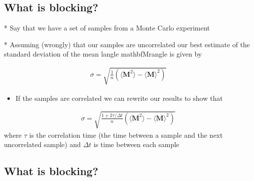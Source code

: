 \documentclass[letterpaper,10pt,english]{sphinxmanual}
\begin{document}
\subsection{What is blocking?}
\label{\detokenize{chapter3:what-is-blocking}}

\begin{sphinxVerbatim}[commandchars=\\\{\}]
* Say that we have a set of samples from a Monte Carlo experiment

* Assuming (wrongly) that our samples are uncorrelated our best estimate of the standard deviation of the mean \PYGZdl{}\PYGZbs{}langle \PYGZbs{}mathbf\PYGZob{}M\PYGZcb{}\PYGZbs{}rangle\PYGZdl{} is given by
\end{sphinxVerbatim}
\begin{equation*}
\begin{split}
\sigma=\sqrt{\frac{1}{n}\left(\langle \mathbf{M}^2\rangle-\langle \mathbf{M}\rangle^2\right)}
\end{split}
\end{equation*}\begin{itemize}
\item {} 
If the samples are correlated we can rewrite our results to show  that

\end{itemize}
\begin{equation*}
\begin{split}
\sigma=\sqrt{\frac{1+2\tau/\Delta t}{n}\left(\langle \mathbf{M}^2\rangle-\langle \mathbf{M}\rangle^2\right)}
\end{split}
\end{equation*}
where \(\tau\) is the correlation time (the time between a sample and the next uncorrelated sample) and \(\Delta t\) is time between each sample


\subsection{What is blocking?}
\label{\detokenize{chapter3:id17}}
\end{document}
